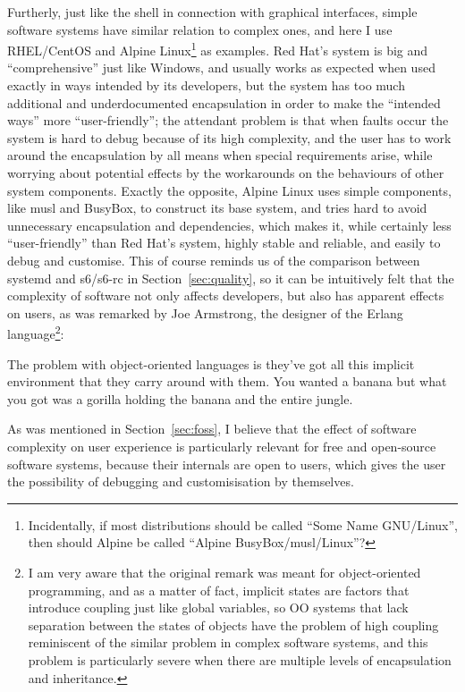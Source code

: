 Furtherly, just like the shell in connection with graphical interfaces,
simple software systems have similar relation to complex ones, and here I
use RHEL/CentOS and Alpine Linux\footnote{Incidentally, if most distributions
should be called ``Some Name GNU/Linux'', then
should Alpine be called ``Alpine BusyBox/musl/Linux''?} as examples.  Red Hat's
system is big and ``comprehensive'' just like Windows, and usually works as
expected when used exactly in ways intended by its developers, but the system
has too much additional and underdocumented encapsulation in order to make the
``intended ways'' more ``user-friendly''; the attendant problem is that when
faults occur the system is hard to debug because of its high complexity, and the
user has to work around the encapsulation by all means when special requirements
arise, while worrying about potential effects by the workarounds on the
behaviours of other system components.  Exactly the
opposite, Alpine Linux uses simple components, like musl and BusyBox, to
construct its base system, and tries hard to avoid unnecessary encapsulation
and dependencies, which makes it, while certainly less ``user-friendly'' than
Red Hat's system, highly stable and reliable, and easily to debug and customise.
This of course reminds us of the comparison between systemd and s6/s6-rc in
Section~\ref{sec:quality}, so it can be intuitively felt that the complexity of
software not only affects developers, but also has apparent effects on users,
as was remarked by Joe Armstrong, the designer of the Erlang language\footnote%
{I am very aware that the original remark was meant for object-oriented
programming, and as a matter of fact, implicit states are factors that
introduce coupling just like global variables, so OO systems that lack
separation between the states of objects have the problem of high
coupling reminiscent of the similar problem in complex software
systems, and this problem is particularly severe when there
are multiple levels of encapsulation and inheritance.}:
\begin{quoting}
	The problem with object-oriented languages is they've got all this implicit
	environment that they carry around with them.  You wanted a banana but
	what you got was a gorilla holding the banana and the entire jungle.
\end{quoting}
As was mentioned in Section~\ref{sec:foss}, I believe that the effect
of software complexity on user experience is particularly relevant
for free and open-source software systems, because their internals
are open to users, which gives the user the possibility
of debugging and customisisation by themselves.

